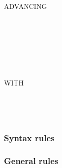 \begin{syntax}
   \recordname
  \begin{0-1}
    \begin{1=}
      \identifier \\
      \literal \\
      \functionname
    \end{1=}
  \end{0-1}

  \begin{0-1}
    \begin{1=}
       \\
    \end{1=}
    ADVANCING
    \begin{1=}
      \begin{1=}
        \identifier \\
        \literal
      \end{1=}
      \begin{0-1}
         \\
      \end{0-1} \\

      \mnemonicname \\

    \end{1=}
  \end{0-1}

  \begin{0-1}
  \end{0-1}
  \begin{0-1}
    WITH
    \begin{0-1}
    \end{0-1}
  \end{0-1}

  \begin{0+}
      \imperativestatement \\
       \imperativestatement
  \end{0+} \\

  \begin{0-1}
  \end{0-1}
\end{syntax}

\subsubsection{Syntax rules}

\subsubsection{General rules}


